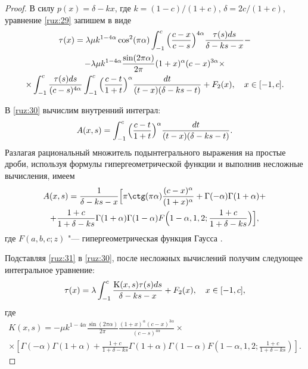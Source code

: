 \begin{proof}
В силу $p(x)=\delta-kx$, где $k=(1-c)/(1+c)$, $\delta=2c/(1+c)$, уравнение \eqref{ruz:29}  запишем в виде
\begin{multline}
\tau(x)=\lambda\mu k^{1-4\alpha}\cos^2(\pi\alpha)\int_{-1}^c{\Bigl(\frac{c-x}{c-s}\Bigr)^{4\alpha}\frac{\tau(s)ds}{\delta-ks-x}}-
\\
-\lambda\mu k^{1-4\alpha}\frac{\sin(2\pi\alpha)}{2\pi}(1+x)^\alpha(c-x)^{3\alpha}\times
\\
\times\int_{-1}^c{\frac{\tau(s)ds}{(c-s)^{4\alpha}}}\int_{-1}^c{\Bigl(\frac{c-t}{1+t}\Bigr)^\alpha\frac{dt}{(t-x)(\delta-ks-t)}}+F_2(x), \quad x\in[-1,c].
\label{ruz:30}
\end{multline}

В \eqref{ruz:30} вычислим внутренний интеграл:
$$A(x,s)=\int_{-1}^c{\Bigl(\frac{c-t}{1+t}\Bigr)^\alpha\frac{dt}{(t-x)(\delta-ks-t)}}.$$
Разлагая рациональный множитель подынтегрального выражения на простые дроби, используя формулы гипергеометрической функции  и выполнив несложные вычисления, имеем
\begin{multline}
A(x,s)=\frac{1}{\delta-ks-x}\Bigl[\pi\ctg(\pi\alpha)\frac{(c-x)^\alpha}{(1+x)^\alpha}+\Gamma(-\alpha)\Gamma(1+\alpha)+
\\
+\frac{1+c}{1+\delta-ks}\Gamma(1+\alpha)\Gamma(1-\alpha) F\Bigl(1-\alpha, 1, 2;\frac{1+c}{1+\delta-ks}\Bigr)\Bigr],
\label{ruz:31}
\end{multline}
где
$F(a,b,c;z)$ "--- гипергеометрическая функция Гаусса \cite{ruz:bib:5}.

Подставляя \eqref{ruz:31} в \eqref{ruz:30}, после несложных вычислений получим следующее интегральное уравнение:
\begin{equation}
\tau(x)=\lambda\int_{-1}^c{\frac{{\rm K}(x,s)\tau(s)ds}{\delta-ks-x}}+F_2(x), \quad x\in[-1, c],
\label{ruz:32}
\end{equation}
где
\begin{multline*}
K(x,s)=-\mu k^{1-4\alpha}\frac{\sin(2\pi\alpha)}{2\pi}\frac{(1+x)^\alpha(c-x)^{3\alpha}}{(c-s)^{4\alpha}}\times 
\\
\times\left[\Gamma(-\alpha)\Gamma(1+\alpha)+\frac{1+c}{1+\delta-ks}\Gamma(1+\alpha)\Gamma(1-\alpha)F\left(1-\alpha, 1, 2;\frac{1+c}{1+\delta-ks}\right)\right].
\end{multline*}
\pagebreak


\end{proof}

